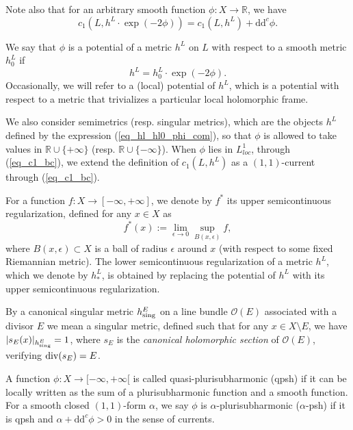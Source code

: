 \documentclass[12pt]{article}
\numberwithin{equation}{section}
\theoremstyle{theorem}
\theoremstyle{definition}
\theoremstyle{remark}
\newcommand{\real}{\mathbb{R}}
\newcommand{\ddc}{\mathrm{d} \mathrm{d}^c}
\begin{document}
	Note also that for an arbitrary smooth function $\phi: X \to \real$, we have
	\begin{equation}\label{eq_c1_bc}
		c_1(L, h^L \cdot \exp(-2 \phi))
		=
		c_1(L, h^L)
		+
		\ddc \phi.
	\end{equation}
	\par 
	We say that $\phi$ is a potential of a metric $h^L$ on $L$ with respect to a smooth metric $h^L_0$ if 
	\begin{equation}\label{eq_hl_hl0_phi_com}
		h^L = h^L_0 \cdot \exp(-2 \phi).
	\end{equation}
	Occasionally, we will refer to a (local) potential of $h^L$, which is a potential with respect to a metric that trivializes a particular local holomorphic frame.
	\par
	We also consider semimetrics (resp. singular metrics), which are the objects $h^L$ defined by the expression (\ref{eq_hl_hl0_phi_com}), so that $\phi$ is allowed to take values in $\real \cup \{ +\infty \}$ (resp. $\real \cup \{ -\infty \}$).
	When $\phi$ lies in $L^1_{loc}$, through (\ref{eq_c1_bc}), we extend the definition of $c_1(L, h^L)$ as a $(1, 1)$-current through (\ref{eq_c1_bc}).
	\par 
	For a function $f: X \to [-\infty, +\infty]$, we denote by $f^*$ its upper semicontinuous regularization, defined for any $x \in X$ as 
	\begin{equation}
		f^*(x) := \lim_{\epsilon \to 0} \sup_{B(x, \epsilon)} f,
	\end{equation}
	where $B(x, \epsilon) \subset X$ is a ball of radius $\epsilon$ around $x$ (with respect to some fixed Riemannian metric). 
	The lower semicontinuous regularization of a metric $h^L$, which we denote by $h^L_*$, is obtained by replacing the potential of $h^L$ with its upper semicontinuous regularization.
	\par 
	By a canonical singular metric $h^E_{{\rm{sing}}}$ on a line bundle $\mathscr{O}(E)$ associated with a divisor $E$ we mean a singular metric, defined such that for any $x \in X \setminus E$, we have $|s_E(x)|_{h^E_{{\rm{sing}}}} = 1$, where $s_E$ is the \textit{canonical holomorphic section} of $\mathscr{O}(E)$, verifying ${\rm{div}}(s_E) = E$.
	\par 	
	A function $\phi: X \to [-\infty, +\infty[$ is called quasi-plurisubharmonic (qpsh) if it can be locally written as the sum of a plurisubharmonic function and a smooth function. 
	For a smooth closed $(1, 1)$-form $\alpha$, we say $\phi$ is $\alpha$-plurisubharmonic ($\alpha$-psh) if it is qpsh and $\alpha + \ddc \phi > 0$ in the sense of currents.
\end{document}

